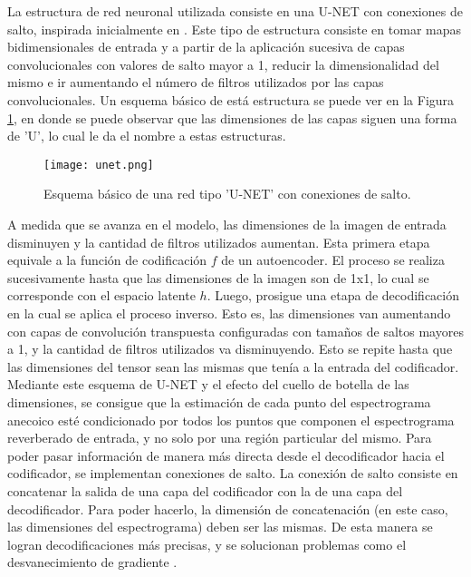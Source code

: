La estructura de red neuronal utilizada consiste en una U-NET con conexiones de salto, inspirada inicialmente en \cite{FCN}. Este tipo de estructura consiste en tomar mapas bidimensionales de entrada y a partir de la aplicación sucesiva de capas convolucionales con valores de salto mayor a 1, reducir la dimensionalidad del mismo e ir aumentando el número de filtros utilizados por las capas convolucionales. Un esquema básico de está estructura se puede ver en la Figura \ref{fig:unet}, en donde se puede observar que las dimensiones de las capas siguen una forma de 'U', lo cual le da el nombre a estas estructuras.

\begin{figure}[H]
	\centering{}
	\texttt{[image: unet.png]}
	\caption{Esquema básico de una red tipo 'U-NET' con conexiones de salto.}
	\label{fig:unet}
\end{figure}

A medida que se avanza en el modelo, las dimensiones de la imagen de entrada disminuyen y la cantidad de filtros utilizados aumentan. Esta primera etapa equivale a la función de codificación $f$ de un autoencoder. El proceso se realiza sucesivamente hasta que las dimensiones de la imagen son de 1x1, lo cual se corresponde con el espacio latente $h$. Luego, prosigue una etapa de decodificación en la cual se aplica el proceso inverso. Esto es, las dimensiones van aumentando con capas de convolución transpuesta configuradas con tamaños de saltos mayores a 1, y la cantidad de filtros utilizados va disminuyendo. Esto se repite hasta que las dimensiones del tensor sean las mismas que tenía a la entrada del codificador. Mediante este esquema de U-NET y el efecto del cuello de botella de las dimensiones, se consigue que la estimación de cada punto del espectrograma anecoico esté condicionado por todos los puntos que componen el espectrograma reverberado de entrada, y no solo por una región particular del mismo. Para poder pasar información de manera más directa desde el decodificador hacia el codificador, se implementan conexiones de salto. La conexión de salto consiste en concatenar la salida de una capa del codificador con la de una capa del decodificador. Para poder hacerlo, la dimensión de concatenación (en este caso, las dimensiones del espectrograma) deben ser las mismas. De esta manera se logran decodificaciones más precisas, y se solucionan problemas como el desvanecimiento de gradiente \cite{lagartija}. 

